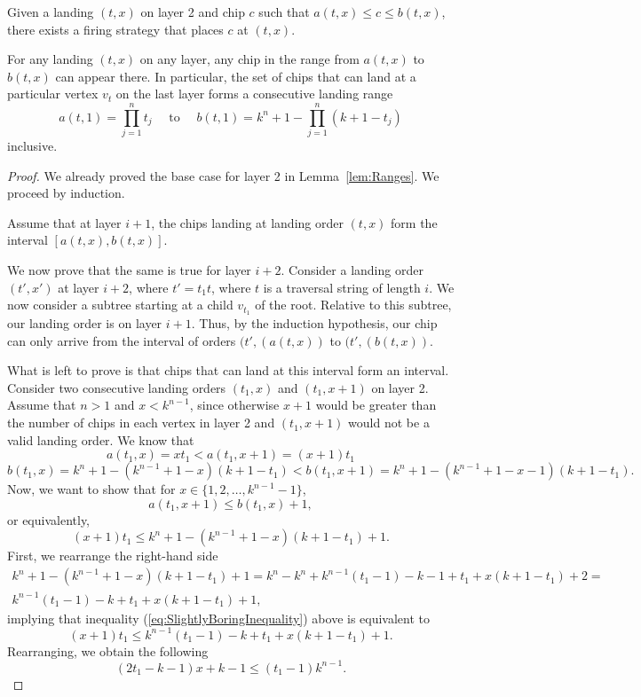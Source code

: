 \documentclass[10pt,a4paper]{amsart}
\begin{document}
\begin{lemma}\label{lem:Ranges}
   Given a landing $(t,x)$ on layer 2 and chip $c$ such that $a(t,x) \leq c \leq b(t,x)$, there exists a firing strategy that places $c$ at $(t,x)$.
\end{lemma}

\begin{theorem}
\label{thm:ranges}
    For any landing $(t,x)$ on any layer, any chip in the range from $a(t,x)$ to $b(t,x)$ can appear there. In particular, the set of chips that can land at a particular vertex $v_t$ on the last layer forms a consecutive landing range
    \[a(t, 1) = \prod_{j=1}^n t_j \quad \textrm{ to } \quad b(t, 1) = k^n+1-\prod_{j=1}^n(k+1-t_j)\] inclusive. 
\end{theorem}

\begin{proof}
    We already proved the base case for layer 2 in Lemma~\ref{lem:Ranges}. We proceed by induction.
    
    Assume that at layer $i+1$, the chips landing at landing order $(t,x)$ form the interval $[a(t,x), b(t,x)]$.

    We now prove that the same is true for layer $i+2$. Consider a landing order $(t',x')$ at layer $i+2$, where $t'=t_1t$, where $t$ is a traversal string of length $i$. We now consider a subtree starting at a child $v_{t_1}$ of the root. Relative to this subtree, our landing order is on layer $i+1$. Thus, by the induction hypothesis, our chip can only arrive from the interval of orders $(t',(a(t,x))$ to $(t',(b(t,x))$.
    
    What is left to prove is that chips that can land at this interval form an interval. Consider two consecutive landing orders $(t_1,x)$ and $(t_1,x+1)$ on layer 2. Assume that $n > 1$ and $x < k^{n-1}$, since otherwise $x+1$ would be greater than the number of chips in each vertex in layer 2 and $(t_1, x+1)$ would not be a valid landing order.  We know that 
    \[a(t_1,x) = xt_1 < a(t_1,x+1) = (x+1)t_1\]
    \[b(t_1,x) = k^n +1- (k^{n-1} + 1 - x) (k+1-t_1) < b(t_1,x+1) =k^n+1 - (k^{n-1} + 1 - x-1) (k+1-t_1).\]
    Now, we want to show that for $x \in \{1, 2, \dots, k^{n-1}-1\}$,
    \[a(t_1,x+1) \leq b(t_1,x) + 1,\]
    or equivalently,
     \begin{equation}\label{eq:SlightlyBoringInequality}
         (x+1)t_1 \leq k^n +1- (k^{n-1} + 1 - x) (k+1-t_1) + 1.
     \end{equation}
     First, we rearrange the right-hand side
     \begin{multline*}
        k^n +1- (k^{n-1} + 1 - x) (k+1-t_1) + 1 = k^n-k^n + k^{n-1} (t_1-1) -k-1+t_1 +x (k+1-t_1) + 2 = \\
        k^{n-1} (t_1-1) -k+ t_1 +x (k+1-t_1)+1,
     \end{multline*}
     implying that inequality (\ref{eq:SlightlyBoringInequality}) above is equivalent to
     \[(x+1)t_1 \leq k^{n-1} (t_1-1) -k+ t_1 +x (k+1-t_1)+1.\]
     Rearranging, we obtain the following
     \begin{equation}\label{eq:SimplerInequality}
         (2t_1-k-1) x+k-1 \leq (t_1-1) k^{n-1}.
     \end{equation}


\end{proof}
\end{document}

